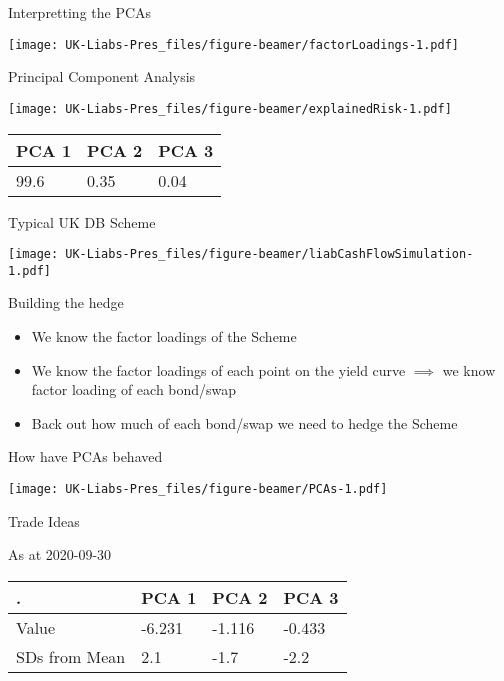\documentclass[ignorenonframetext,]{beamer}
\providecommand{\tightlist}{%
  \setlength{\itemsep}{0pt}\setlength{\parskip}{0pt}}
\begin{document}
\begin{frame}{Interpretting the PCAs}
\protect\hypertarget{interpretting-the-pcas}{}

\texttt{[image: UK-Liabs-Pres\_files/figure-beamer/factorLoadings-1.pdf]}

\end{frame}

\begin{frame}{Principal Component Analysis}
\protect\hypertarget{principal-component-analysis}{}

\texttt{[image: UK-Liabs-Pres\_files/figure-beamer/explainedRisk-1.pdf]}

\begin{longtable}[]{@{}lll@{}}
\toprule
PCA 1 & PCA 2 & PCA 3\tabularnewline
\midrule
\endhead
99.6 & 0.35 & 0.04\tabularnewline
\bottomrule
\end{longtable}

\end{frame}

\begin{frame}{Typical UK DB Scheme}
\protect\hypertarget{typical-uk-db-scheme}{}

\texttt{[image: UK-Liabs-Pres\_files/figure-beamer/liabCashFlowSimulation-1.pdf]}

\end{frame}

\begin{frame}{Building the hedge}
\protect\hypertarget{building-the-hedge}{}

\begin{itemize}
\tightlist
\item
  We know the factor loadings of the Scheme
\item
  We know the factor loadings of each point on the yield curve
  \(\implies\) we know factor loading of each bond/swap
\item
  Back out how much of each bond/swap we need to hedge the Scheme
\end{itemize}

\end{frame}

\begin{frame}{How have PCAs behaved}
\protect\hypertarget{how-have-pcas-behaved}{}

\texttt{[image: UK-Liabs-Pres\_files/figure-beamer/PCAs-1.pdf]}

\end{frame}

\begin{frame}{Trade Ideas}
\protect\hypertarget{trade-ideas}{}

As at 2020-09-30

\begin{longtable}[]{@{}llll@{}}
\toprule
. & PCA 1 & PCA 2 & PCA 3\tabularnewline
\midrule
\endhead
Value & -6.231 & -1.116 & -0.433\tabularnewline
SDs from Mean & 2.1 & -1.7 & -2.2\tabularnewline
\bottomrule
\end{longtable}

\end{frame}
\end{document}
